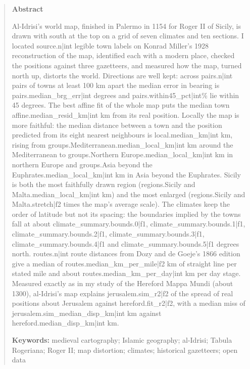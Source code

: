 \documentclass[11pt,a4paper]{article}
\begin{document}
\begin{quote}
\small
\begin{center}\textbf{Abstract}\end{center}
Al-Idrisi's world map, finished in Palermo in 1154 for Roger II of Sicily, is drawn with south at the top on a grid of seven climates and ten sections. I located {{source.n|int}} legible town labels on Konrad Miller's 1928 reconstruction of the map, identified each with a modern place, checked the positions against three gazetteers, and measured how the map, turned north up, distorts the world. Directions are well kept: across {{pairs.n|int}} pairs of towns at least 100 km apart the median error in bearing is {{pairs.median_brg_err|int}} degrees and {{pairs.within45_pct|int}}\% lie within 45 degrees. The best affine fit of the whole map puts the median town {{affine.median_resid_km|int}} km from its real position. Locally the map is more faithful: the median distance between a town and the position predicted from its eight nearest neighbours is {{local.median_km|int}} km, rising from {{groups.Mediterranean.median_local_km|int}} km around the Mediterranean to {{groups.Northern Europe.median_local_km|int}} km in northern Europe and {{groups.Asia beyond the Euphrates.median_local_km|int}} km in Asia beyond the Euphrates. Sicily is both the most faithfully drawn region ({{regions.Sicily and Malta.median_local_km|int}} km) and the most enlarged ({{regions.Sicily and Malta.stretch|f2}} times the map's average scale). The climates keep the order of latitude but not its spacing: the boundaries implied by the towns fall at about {{climate_summary.bounds.0|f1}}, {{climate_summary.bounds.1|f1}}, {{climate_summary.bounds.2|f1}}, {{climate_summary.bounds.3|f1}}, {{climate_summary.bounds.4|f1}} and {{climate_summary.bounds.5|f1}} degrees north. {{routes.n|int}} route distances from Dozy and de Goeje's 1866 edition give a median of {{routes.median_km_per_mile|f2}} km of straight line per stated mile and about {{routes.median_km_per_day|int}} km per day stage. Measured exactly as in my study of the Hereford Mappa Mundi (about 1300), al-Idrisi's map explains {{jerusalem.sim_r2|f2}} of the spread of real positions about Jerusalem against {{hereford.fit_r2|f2}}, with a median miss of {{jerusalem.sim_median_disp_km|int}} km against {{hereford.median_disp_km|int}} km.

\textbf{Keywords:} medieval cartography; Islamic geography; al-Idrisi; Tabula Rogeriana; Roger II; map distortion; climates; historical gazetteers; open data
\end{quote}
\end{document}
